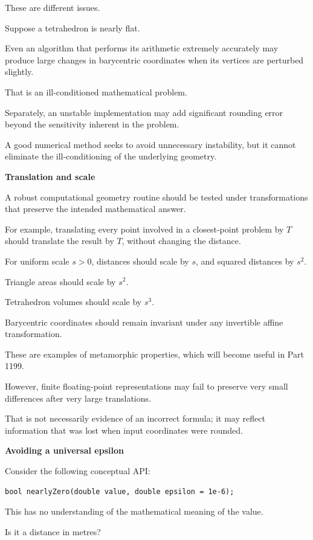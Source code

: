 These are different issues.

Suppose a tetrahedron is nearly flat.

Even an algorithm that performs its arithmetic extremely accurately may produce large changes in barycentric coordinates when its vertices are perturbed slightly.

That is an ill-conditioned mathematical problem.

Separately, an unstable implementation may add significant rounding error beyond the sensitivity inherent in the problem.

A good numerical method seeks to avoid unnecessary instability, but it cannot eliminate the ill-conditioning of the underlying geometry.

\textbf{Translation and scale}

A robust computational geometry routine should be tested under transformations that preserve the intended mathematical answer.

For example, translating every point involved in a closest-point problem by \(T\) should translate the result by \(T\), without changing the distance.

For uniform scale \(s>0\), distances should scale by \(s\), and squared distances by \(s^2\).

Triangle areas should scale by \(s^2\).

Tetrahedron volumes should scale by \(s^3\).

Barycentric coordinates should remain invariant under any invertible affine transformation.

These are examples of metamorphic properties, which will become useful in Part 1199.

However, finite floating-point representations may fail to preserve very small differences after very large translations.

That is not necessarily evidence of an incorrect formula; it may reflect information that was lost when input coordinates were rounded.

\textbf{Avoiding a universal epsilon}

Consider the following conceptual API:

\begin{verbatim}
bool nearlyZero(double value, double epsilon = 1e-6);
\end{verbatim}

This has no understanding of the mathematical meaning of the value.

Is it a distance in metres?

